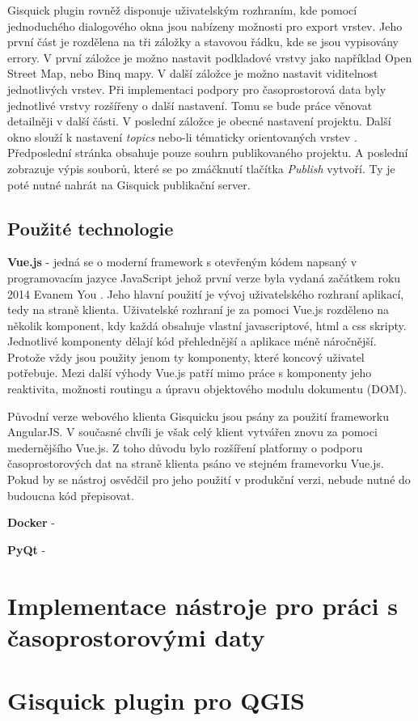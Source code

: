 \newpage
Gisquick plugin rovněž disponuje uživatelským rozhraním, kde pomocí jednoduchého dialogového okna jsou nabízeny možnosti pro export vrstev. Jeho první část je rozdělena na tři záložky a stavovou řádku, kde se jsou vypisovány errory. V první záložce je možno nastavit podkladové vrstvy jako například Open Street Map, nebo Binq mapy. V další záložce je možno nastavit viditelnost jednotlivých vrstev. Při implementaci podpory pro časoprostorová data byly jednotlivé vrstvy rozšířeny o další nastavení. Tomu se bude práce věnovat detailněji v další části. V poslední záložce je obecné nastavení projektu. Další okno slouží k nastavení \textit{topics} nebo-li tématicky orientovaných vrstev \cite{gisquick-manual}. Předposlední stránka obsahuje pouze souhrn publikovaného projektu. A poslední zobrazuje výpis souborů, které se po zmáčknutí tlačítka \textit{Publish} vytvoří. Ty je poté nutné nahrát na Gisquick publikační server.

\newpage
\subsection{Použité technologie}
	
\textbf{Vue.js} - jedná se o moderní framework s otevřeným kódem napsaný v programovacím jazyce JavaScript jehož první verze byla vydaná začátkem roku 2014 Evanem You \cite{vue-history}. Jeho hlavní použití je vývoj uživatelského rozhraní aplikací, tedy na straně klienta. Uživatelské rozhraní je za pomoci Vue.js rozděleno na několik  komponent, kdy každá obsahuje vlastní javascriptové, html a css skripty. Jednotlivé komponenty dělají kód přehlednější a aplikace méně náročnější. Protože vždy jsou použity jenom ty komponenty, které koncový uživatel potřebuje. Mezi další výhody Vue.js patří mimo práce s komponenty jeho reaktivita, možnosti routingu a úpravu objektového modulu dokumentu (DOM).  

Původní verze webového klienta Gisquicku jsou psány za použití frameworku AngularJS. V současné chvíli je však celý klient vytvářen znovu za pomoci medernějšího Vue.js. Z toho důvodu bylo rozšíření platformy o podporu časoprostorových dat na straně klienta psáno ve stejném framevorku Vue.js. Pokud by se nástroj osvědčil pro jeho použití v produkční verzi, nebude nutné do budoucna kód přepisovat.

\bigskip
\noindent
\textbf{Docker} -
 
\bigskip
\noindent
\textbf{PyQt} - 

\newpage
\section{Implementace nástroje pro práci s časoprostorovými daty}

\section{Gisquick plugin pro QGIS}

